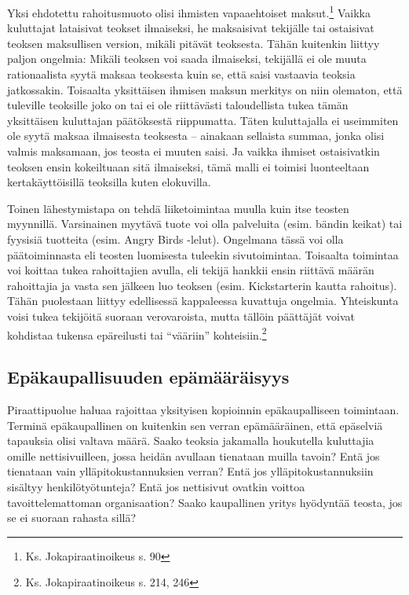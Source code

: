 \documentclass[titlepage,12pt]{article}
\begin{document}
Yksi ehdotettu rahoitusmuoto olisi ihmisten vapaaehtoiset
maksut.\footnote{Ks. Jokapiraatinoikeus s. 90} Vaikka kuluttajat
lataisivat teokset ilmaiseksi, he maksaisivat tekijälle tai ostaisivat
teoksen maksullisen version, mikäli pitävät teoksesta.  Tähän
kuitenkin liittyy paljon ongelmia: Mikäli teoksen voi saada
ilmaiseksi, tekijällä ei ole muuta rationaalista syytä maksaa
teoksesta kuin se, että saisi vastaavia teoksia jatkossakin.
Toisaalta yksittäisen ihmisen maksun merkitys on niin olematon, että
tuleville teoksille joko on tai ei ole riittävästi taloudellista tukea
tämän yksittäisen kuluttajan päätöksestä riippumatta.  Täten
kuluttajalla ei useimmiten ole syytä maksaa ilmaisesta teoksesta --
ainakaan sellaista summaa, jonka olisi valmis maksamaan, jos teosta ei
muuten saisi.  Ja vaikka ihmiset ostaisivatkin teoksen ensin
kokeiltuaan sitä ilmaiseksi, tämä malli ei toimisi luonteeltaan
kertakäyttöisillä teoksilla kuten elokuvilla.



Toinen lähestymistapa on tehdä liiketoimintaa muulla kuin itse teosten
myynnillä.  Varsinainen myytävä tuote voi olla palveluita
(esim. bändin keikat) tai fyysisiä tuotteita (esim. Angry Birds
-lelut).  Ongelmana tässä voi olla päätoiminnasta eli teosten
luomisesta tuleekin sivutoimintaa.  Toisaalta toimintaa voi koittaa
tukea rahoittajien avulla, eli tekijä hankkii ensin riittävä määrän
rahoittajia ja vasta sen jälkeen luo teoksen (esim. Kickstarterin
kautta rahoitus).  Tähän puolestaan liittyy edellisessä kappaleessa
kuvattuja ongelmia.  Yhteiskunta voisi tukea tekijöitä suoraan
verovaroista, mutta tällöin päättäjät voivat kohdistaa tukensa
epäreilusti tai ``vääriin'' kohteisiin.\footnote{Ks. Jokapiraatinoikeus
  s. 214, 246}







\subsection{Epäkaupallisuuden epämääräisyys}

Piraattipuolue haluaa rajoittaa yksityisen kopioinnin epäkaupalliseen
toimintaan.  Terminä epäkaupallinen on kuitenkin sen verran
epämääräinen, että epäselviä tapauksia olisi valtava määrä.  Saako
teoksia jakamalla houkutella kuluttajia omille nettisivuilleen, jossa
heidän avullaan tienataan muilla tavoin? Entä jos tienataan vain
ylläpitokustannuksien verran?  Entä jos ylläpitokustannuksiin sisältyy
henkilötyötunteja?  Entä jos nettisivut ovatkin voittoa
tavoittelemattoman organisaation?  Saako kaupallinen yritys hyödyntää
teosta, jos se ei suoraan rahasta sillä?
\end{document}
